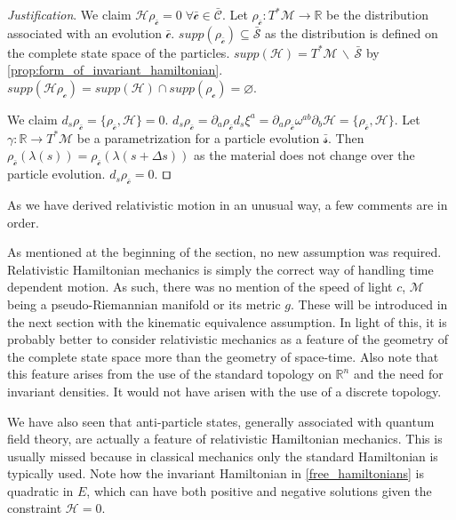 \documentclass[smallextended]{svjour3}
\numberwithin{equation}{section}
\newenvironment{justification}{\emph{Justification}.}{\hfill\(\qed\)}
\theoremstyle{definition}
\newenvironment{justification}{\emph{Justification}.}{\qed}
\begin{document}
\begin{justification}
	We claim $\mathcal{H} \rho_{\bar{\mathcal{c}}} = 0 \; \forall \bar{\mathcal{c}} \in \bar{\mathcal{C}}$. Let $\rho_{\bar{\mathcal{c}}} : T^*\mathcal{M} \rightarrow \mathbb{R}$ be the distribution associated with an evolution $\bar{\mathcal{c}}$. $supp(\rho_{\bar{\mathcal{c}}}) \subseteq \bar{\mathcal{S}}$ as the distribution is defined on the complete state space of the particles. $supp(\mathcal{H}) = T^*\mathcal{M} \,\backslash\, \bar{\mathcal{S}}$ by \ref{prop:form_of_invariant_hamiltonian}. $supp(\mathcal{H} \rho_\mathcal{c}) = supp(\mathcal{H}) \cap supp(\rho_\mathcal{c}) = \varnothing$.
	
	We claim $d_s \rho_{\bar{\mathcal{c}}} = \{ \rho_{\bar{\mathcal{c}}}, \mathcal{H} \} = 0$. $d_s \rho_{\bar{\mathcal{c}}}= \partial_a \rho_{\bar{\mathcal{c}}} d_s \xi^a = \partial_a \rho_{\bar{\mathcal{c}}} \omega^{ab} \partial_b \mathcal{H} = \{ \rho_{\bar{\mathcal{c}}}, \mathcal{H} \}$. Let $\gamma : \mathbb{R} \rightarrow T^*\mathcal{M}$ be a parametrization for a particle evolution $\bar{\mathcal{s}}$. Then $\rho_{\bar{\mathcal{c}}}(\lambda(s)) = \rho_{\bar{\mathcal{c}}}(\lambda(s + \Delta s))$ as the material does not change over the particle evolution. $d_s \rho_{\bar{\mathcal{c}}} = 0$.
\end{justification}

As we have derived relativistic motion in an unusual way, a few comments are in order.

As mentioned at the beginning of the section, no new assumption was required. Relativistic Hamiltonian mechanics is simply the correct way of handling time dependent motion. As such, there was no mention of the speed of light $c$, $\mathcal{M}$ being a pseudo-Riemannian manifold or its metric $g$. These will be introduced in the next section with the kinematic equivalence assumption. In light of this, it is probably better to consider relativistic mechanics as a feature of the geometry of the complete state space more than the geometry of space-time. Also note that this feature arises from the use of the standard topology on $\mathbb{R}^n$ and the need for invariant densities. It would not have arisen with the use of a discrete topology.

We have also seen that anti-particle states, generally associated with quantum field theory, are actually a feature of relativistic Hamiltonian mechanics. This is usually missed because in classical mechanics only the standard Hamiltonian is typically used. Note how the invariant Hamiltonian in \ref{free_hamiltonians} is quadratic in $E$, which can have both positive and negative solutions given the constraint $\mathcal{H}=0$.
\end{document}
